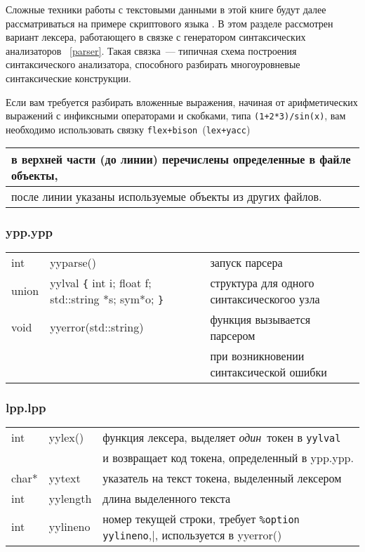 
Сложные техники работы с текстовыми данными в этой книге будут далее 
рассматриваться на примере скриптового языка \bi. В этом разделе
рассмотрен вариант лексера, работающего в связке с генератором синтаксических
анализаторов \ \ref{parser}. Такая связка\ --- типичная схема
построения синтаксического анализатора, способного разбирать многоуровневые
синтаксические конструкции.

\begin{framed}
Если вам требуется разбирать вложенные выражения, начиная от арифметических
выражений с инфиксными операторами и скобками, типа \verb|(1+2*3)/sin(x)|,
вам необходимо использовать связку \verb|flex+bison|\ (\verb|lex+yacc|)   
\end{framed}

\begin{tabular}{l}
в верхней части (до линии) перечислены определенные в файле объекты,\\
\hline
после линии указаны используемые объекты из других файлов. 
\end{tabular}

\subsubsection{ypp.ypp}

\begin{tabular}{l l l}
int & yyparse() & запуск парсера \\
union & yylval \verb|{| int i; float f; std::string *s; sym*o; \verb|}| &
структура для одного синтаксическогоо узла \\
\hline
void & yyerror(std::string) &
функция вызывается парсером\\&& при возникновении синтаксической ошибки \\
\end{tabular}

\subsubsection{lpp.lpp}

\begin{tabular}{l l l}
int & yylex() & функция лексера, выделяет \emph{один}\ токен в \verb|yylval|\\
&&и возвращает код токена, определенный в ypp.ypp.\\
char* & yytext & указатель на текст токена, выделенный лексером \\
int & yylength & длина выделенного текста\\
int & yylineno & номер текущей строки, требует \verb|%option yylineno|,
используется в yyerror()\\
\end{tabular}

